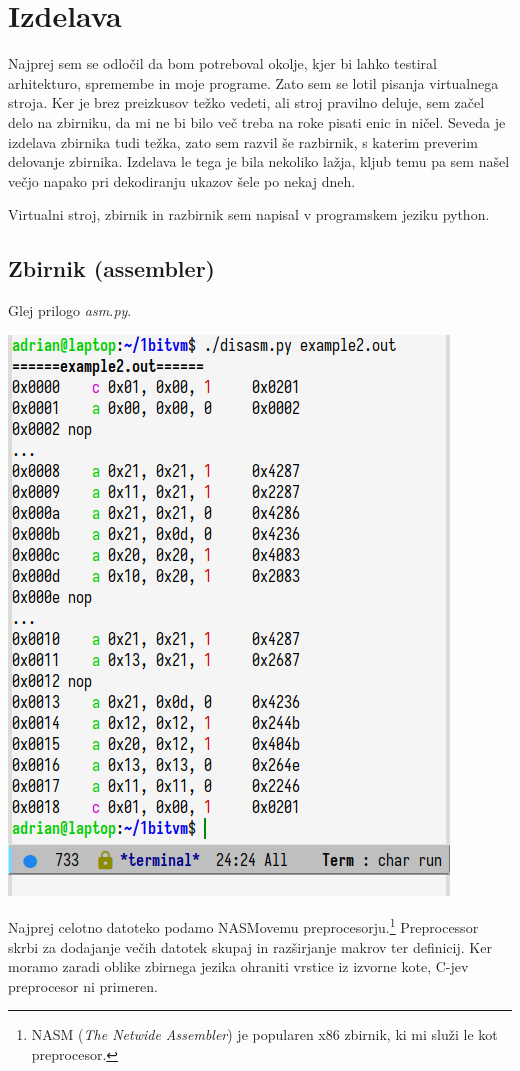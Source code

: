 \documentclass[12pt]{article}
\begin{document}
\section{Izdelava}
Najprej sem se odločil da bom potreboval okolje, kjer bi lahko testiral arhitekturo, spremembe in moje programe.
Zato sem se lotil pisanja virtualnega stroja.
Ker je brez preizkusov težko vedeti, ali stroj pravilno deluje, sem začel delo na zbirniku, da mi ne bi bilo več treba na roke pisati enic in ničel.
Seveda je izdelava zbirnika tudi težka, zato sem razvil še razbirnik, s katerim preverim delovanje zbirnika.
Izdelava le tega je bila nekoliko lažja, kljub temu pa sem našel večjo napako pri dekodiranju ukazov šele po nekaj dneh.

Virtualni stroj, zbirnik in razbirnik sem napisal v programskem jeziku python.
\subsection{Zbirnik (assembler)}
Glej prilogo \textit{asm.py}.

\begin{center}
  \includegraphics[width=.3\linewidth]{slike/razbirnik.png}
\end{center}

Najprej celotno datoteko podamo NASMovemu preprocesorju.\footnote{NASM (\textit{The Netwide Assembler}) je popularen x86 zbirnik, ki mi služi le kot preprocesor.}
Preprocessor skrbi za dodajanje večih datotek skupaj in razširjanje makrov ter definicij.
Ker moramo zaradi oblike zbirnega jezika ohraniti vrstice iz izvorne kote, C-jev preprocesor ni primeren.
\end{document}
